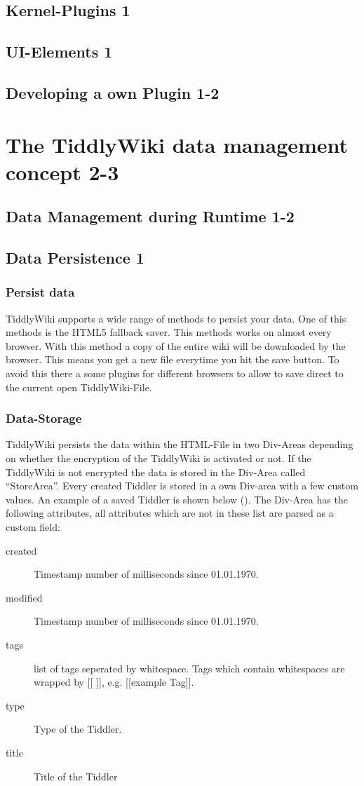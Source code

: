 \documentclass[12pt,a4paper]{article}
\begin{document}
\subsection{Kernel-Plugins 1}
\subsection{UI-Elements 1}
\subsection{Developing a own Plugin 1-2}
\section{The TiddlyWiki data management concept 2-3}
\subsection{Data Management during Runtime 1-2}
\newpage 
\subsection{Data Persistence 1}
\subsubsection*{Persist data}
TiddlyWiki supports a wide range of methods to persist your data. One of this methods is the HTML5 fallback saver. This methods works on almost every browser. With this method a copy of the entire wiki will be downloaded by the browser. This means you get a new file everytime you hit the save button. To avoid this there a some plugins for different browsers to allow to save direct to the current open TiddlyWiki-File.
\subsubsection*{Data-Storage}
TiddlyWiki persists the data within the HTML-File in two Div-Areas depending on whether the encryption of the TiddlyWiki is activated or not. If the TiddlyWiki is not encrypted the data is stored in the Div-Area called ``StoreArea''. Every created Tiddler is stored in a own Div-area with a few custom values. An example of a saved Tiddler is shown below (). The Div-Area has the following attributes, all attributes which are not in these list are parsed as a custom field:
\begin{description}
\item[created] Timestamp number of milliseconds since 01.01.1970.
\item[modified] Timestamp number of milliseconds since 01.01.1970.
\item[tags] list of tags seperated by whitespace. Tags which contain whitespaces are wrapped by [[ ]], e.g. [[example Tag]].
\item[type] Type of the Tiddler.
\item[title] Title of the Tiddler
\end{description}
\end{document}
